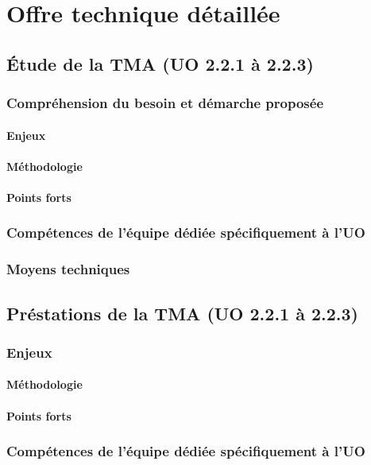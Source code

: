 \chapter{Offre technique détaillée}
	\section{Étude de la TMA (UO 2.2.1 à 2.2.3)}
	\subsection{Compréhension du besoin et démarche proposée}
	\subsubsection{Enjeux}
	\subsubsection{Méthodologie}
	\subsubsection{Points forts}
	\subsection{Compétences de l'équipe dédiée spécifiquement à l'UO}
	\subsection{Moyens techniques}
	
	\section{Préstations de la TMA (UO 2.2.1 à 2.2.3)}
	\subsection{Enjeux}
	\subsubsection{Méthodologie}
	\subsubsection{Points forts}
	\subsection{Compétences de l'équipe dédiée spécifiquement à l'UO}	
